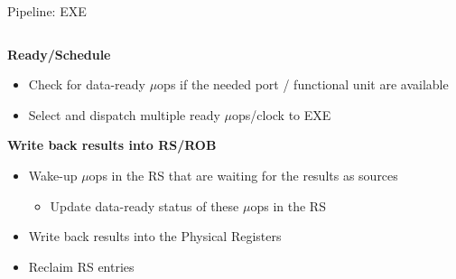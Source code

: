 \documentclass[aspectratio=169,12pt]{beamer}
\begin{document}
\begin{frame}{Pipeline: EXE}
    \centering
    
    \vspace{0.5cm}
    \begin{columns}[T]
        \begin{column}{0.9\textwidth}
            \textbf{Ready/Schedule}
            \begin{itemize}
                \item Check for data-ready $\mu$ops if the needed port / functional unit are available
                \item Select and dispatch multiple ready $\mu$ops/clock to EXE
            \end{itemize}
            
            \textbf{Write back results into RS/ROB}
            \begin{itemize}
                \item Wake-up $\mu$ops in the RS that are waiting for the results as sources
                \begin{itemize}
                    \item Update data-ready status of these $\mu$ops in the RS
                \end{itemize}
                \item Write back results into the Physical Registers
                \item Reclaim RS entries
            \end{itemize}
        \end{column}
    \end{columns}
\end{frame}
\end{document}
